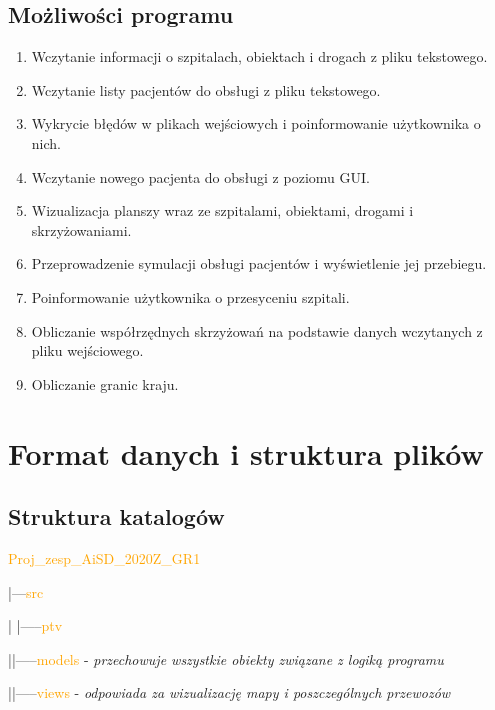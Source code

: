 \documentclass[]{article}
\begin{document}
    \subsection{Możliwości programu}
    \begin{enumerate}
        \item Wczytanie informacji o szpitalach, obiektach i drogach z pliku tekstowego.
        \item Wczytanie listy pacjentów do obsługi z pliku tekstowego.
        \item Wykrycie błędów w plikach wejściowych i poinformowanie użytkownika o nich.
        \item Wczytanie nowego pacjenta do obsługi z poziomu GUI.
        \item Wizualizacja planszy wraz ze szpitalami, obiektami, drogami i skrzyżowaniami.
        \item Przeprowadzenie symulacji obsługi pacjentów i wyświetlenie jej przebiegu.
        \item Poinformowanie użytkownika o przesyceniu szpitali.
        \item Obliczanie współrzędnych skrzyżowań na podstawie danych wczytanych z pliku wejściowego.
        \item Obliczanie granic kraju.
    \end{enumerate}
    


    \section{Format danych i struktura plików}

    \subsection{Struktura katalogów} %
    \textcolor{orange}{Proj\_zesp\_AiSD\_2020Z\_GR1}

    |---\textcolor{orange}{src}

    |\hspace{4mm} |-----\textcolor{orange}{ptv}

    |\hspace{15mm}|-----\textcolor{orange}{models} - \textit{przechowuje wszystkie obiekty związane z logiką programu}

    |\hspace{15mm}|-----\textcolor{orange}{views} -\textit{ odpowiada za wizualizację mapy i poszczególnych przewozów}
\end{document}
